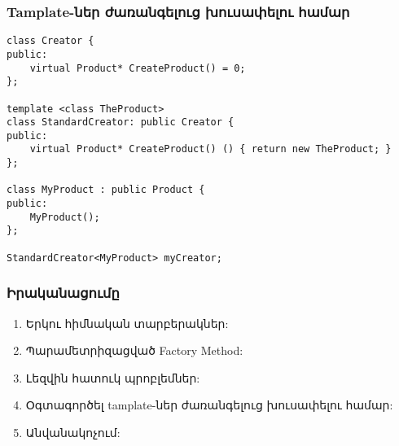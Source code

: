 \documentclass{beamer}
\begin{document}
\begin{frame}[fragile]\frametitle{Tamplate-ներ ժառանգելուց խուսափելու համար}
\begin{english}
\begin{verbatim}
class Creator {
public:
    virtual Product* CreateProduct() = 0;
};

template <class TheProduct>
class StandardCreator: public Creator {
public:
    virtual Product* CreateProduct() () { return new TheProduct; }
};

class MyProduct : public Product {
public:
    MyProduct();
};

StandardCreator<MyProduct> myCreator;
\end{verbatim}
\end{english}
\end{frame}

\begin{frame}\frametitle{Իրականացումը}
\begin{enumerate}
    \item Երկու հիմնական տարբերակներ: \vspace{0.5cm}
    \item Պարամետրիզացված Factory Method: \vspace{0.5cm}
    \item Լեզվին հատուկ պրոբլեմներ: \vspace{0.5cm}
    \item Օգտագործել tamplate-ներ ժառանգելուց խուսափելու համար: \vspace{0.5cm}
    \item Անվանակոչում: \vfill
\end{enumerate}
\end{frame}
\end{document}
